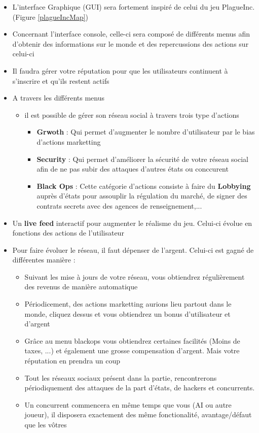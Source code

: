 \begin{itemize}
    \item L'interface Graphique (GUI) sera fortement inspiré de celui du jeu PlagueInc. (Figure \ref{plagueIncMap})
    \item Concernant l'interface console, celle-ci sera composé de différents menus afin d'obtenir des informations sur le monde et des repercussions des actions sur celui-ci
    
    \item Il faudra gérer votre réputation pour que les utilisateurs continuent à s'inscrire et qu'ils restent actifs
    
    \item A travers les différents menus
    
    \begin{itemize}
        \item il est possible de gérer son réseau social à travers trois type d'actions
    
        \begin{itemize}
            \item \textbf{Grwoth} : Qui permet d'augmenter le nombre d'utilisateur par le bias d'actions marketting
            \item \textbf{Security} : Qui permet d'améliorer la sécurité de votre réseau social afin de ne pas subir des attaques d'autres états ou conccurent
            \item \textbf{Black Ops} : Cette catégorie d'actions consiste à faire du \textbf{Lobbying} auprès d'états pour assouplir la régulation du marché, de signer des contrats secrets avec des agences de renseignement,...
        \end{itemize}
        \end{itemize}
        \item{Un \textbf{live feed} interactif pour augmenter le réalisme du jeu. Celui-ci évolue en fonctions des actions de l'utilisateur}
        \item Pour faire évoluer le réseau, il faut dépenser de l'argent. Celui-ci est gagné de différentes manière : 
        \begin{itemize}
            \item Suivant les mise à jours de votre réseau, vous obtiendrez régulièrement des revenus de manière automatique
            \item Périodicement, des actions marketting aurions lieu partout dans le monde, cliquez dessus et vous obtiendrez un bonus d'utilisateur et d'argent
            \item Grâce au menu blackops vous obtiendrez certaines facilités (Moins de taxes, ...) et également une grosse compensation d'argent. Mais votre réputation en prendra un coup
        \item Tout les réseaux sociaux présent dans la partie, rencontrerons périodiquement des attaques de la part d'états, de hackers et concurrents.
        \item Un concurrent commencera en même temps que vous (AI ou autre joueur), il disposera exactement des même fonctionalité, avantage/défaut que les vôtres
    \end{itemize}
    
\end{itemize}

